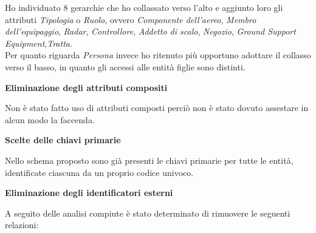 

\textsf{\small Ho individuato 8 gerarchie che ho collassato verso l'alto e aggiunto loro gli attributi \emph{Tipologia} o \emph{Ruolo}, ovvero \emph{Componente dell'aereo}, \emph{Membro dell'equipaggio}, \emph{Radar}, \emph{Controllore}, \emph{Addetto di scalo}, \emph{Negozio}, \emph{Ground Support Equipment},\emph{Tratta}.}\\

\textsf{\small Per quanto riguarda \emph{Persona} invece ho ritenuto più opportuno adottare il collasso verso il basso, in quanto gli accessi alle entità figlie sono distinti.}\break


\textbf{Eliminazione degli attributi compositi}

\textsf{\small Non è stato fatto uso di attributi composti perciò non è stato dovuto assestare in alcun modo la faccenda.}\break %

\textbf{Scelte delle chiavi primarie}

\textsf{\small Nello schema proposto sono già presenti le chiavi primarie per tutte le entità, identificate ciascuna da un proprio codice univoco.}\break

\textbf{Eliminazione degli identificatori esterni}

\textsf{\small A seguito delle analisi compiute è stato determinato di rimuovere le seguenti relazioni:}\\ %

